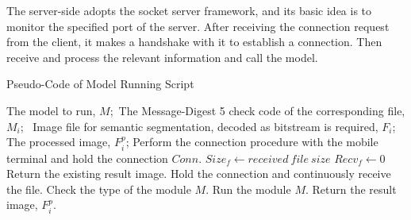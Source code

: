 The server-side adopts the socket server framework, and its basic idea is to monitor the specified port of the server. After receiving the connection request from the client, it makes a handshake with it to establish a connection. Then receive and process the relevant information and call the model.


\begin{algorithm} 
	\caption{Pseudo-Code of Model Running Script} 
	\label{alg3} 
	\begin{algorithmic}
		\REQUIRE 
        The model to run, $M$;\ The Message-Digest 5 check code of the corresponding file, $M_i$;
        \ Image file for semantic segmentation, decoded as bitstream is required, $F_i$;
		\ENSURE 
        The processed image, $F^p_i$;
		\STATE Perform the connection procedure with the mobile terminal and hold the connection $Conn$.
        \STATE $Size_f \gets received\  file\  size$
        \STATE $Recv_f \gets 0$ 
		\ELSE 
		\STATE Return the existing result image.
		\ENDIF
		\STATE Hold the connection and continuously receive the file.
		\ENDWHILE 
		\STATE Check the type of the module $M$.
		\STATE Run the module $M$.
		\STATE Return the result image, $F^p_i$.

	\end{algorithmic} 
\end{algorithm}



\clearpage